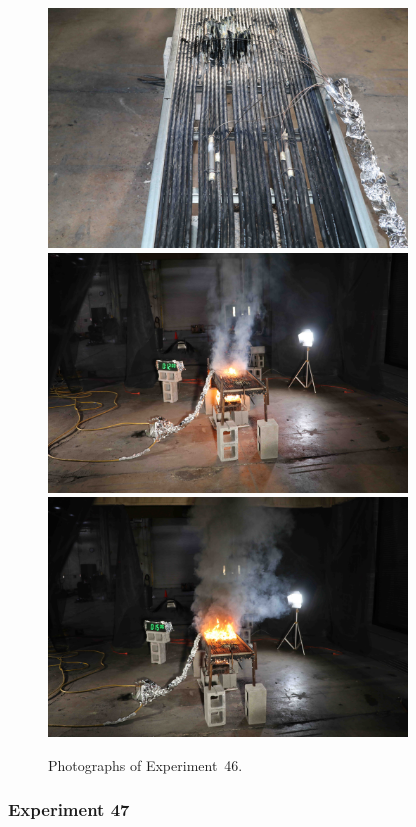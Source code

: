 \begin{figure}[p]
\centering
\includegraphics[height=2.50in]{../FIGURES/Test_46_setup} \\
\includegraphics[height=2.50in]{../FIGURES/Test_46_ignition} \\
\includegraphics[height=2.50in]{../FIGURES/Test_46_burning}
\caption[Photographs of Experiment~46]{Photographs of Experiment~46.}
\label{fig:Test_46_photos}
\end{figure}


\clearpage

\subsubsection{Experiment 47}

